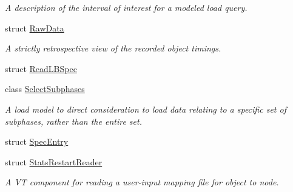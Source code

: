 \begin{DoxyCompactItemize}
\begin{DoxyCompactList}\small\item\em A description of the interval of interest for a modeled load query. \end{DoxyCompactList}\item 
struct \hyperlink{structvt_1_1vrt_1_1collection_1_1balance_1_1_raw_data}{Raw\+Data}
\begin{DoxyCompactList}\small\item\em A strictly retrospective view of the recorded object timings. \end{DoxyCompactList}\item 
struct \hyperlink{structvt_1_1vrt_1_1collection_1_1balance_1_1_read_l_b_spec}{Read\+L\+B\+Spec}
\item 
class \hyperlink{classvt_1_1vrt_1_1collection_1_1balance_1_1_select_subphases}{Select\+Subphases}
\begin{DoxyCompactList}\small\item\em A load model to direct consideration to load data relating to a specific set of subphases, rather than the entire set. \end{DoxyCompactList}\item 
struct \hyperlink{structvt_1_1vrt_1_1collection_1_1balance_1_1_spec_entry}{Spec\+Entry}
\item 
struct \hyperlink{structvt_1_1vrt_1_1collection_1_1balance_1_1_stats_restart_reader}{Stats\+Restart\+Reader}
\begin{DoxyCompactList}\small\item\em A VT component for reading a user-\/input mapping file for object to node. \end{DoxyCompactList}\end{DoxyCompactItemize}
